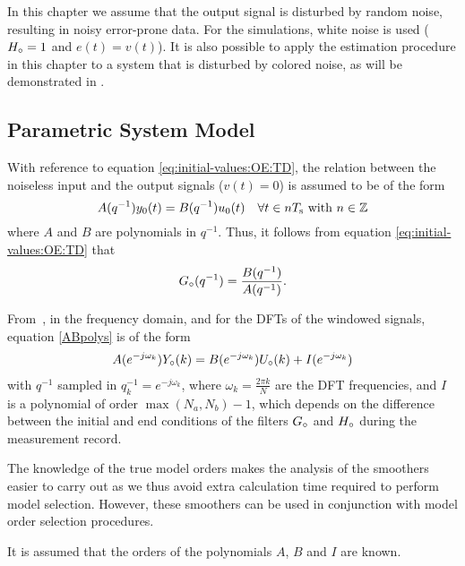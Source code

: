 In this chapter we assume that the output signal is disturbed by random noise, resulting in noisy error-prone data.
For the simulations, white noise is used (${H}_{\circ} = 1$ and $e(t) = v(t)$).
It is also possible to apply the estimation procedure in this chapter to a system that is disturbed by colored noise, as will be demonstrated in . 

\subsection{Parametric System Model}

With reference to equation \eqref{eq:initial-values:OE:TD}, the relation between the noiseless input and the output signals ($v(t)= 0$) is assumed to be of the form
\begin{equation}
    A(q^{-1}) y_0(t) = B(q^{-1}) u_0(t) \quad \forall t \in n T_{\mathrm{s}}{}  \text{ with }  n \in \mathbb{Z}
\label{ABpolys}
\end{equation}
where $A$ and $B$ are polynomials in $q^{-1}$. 
Thus, it follows from equation \eqref{eq:initial-values:OE:TD} that
\begin{equation}
    {G}_{\circ}(q^{-1})= \frac{B(q^{-1})}{A(q^{-1})}
    \text{.}
\end{equation}

From~\citet[Section 6.3.2.]{Pintelon2012}, in the frequency domain, and for the \glspl{DFT} of the windowed signals, equation \eqref{ABpolys} is of the form
\begin{align}
A(e^{-j\omega_k}){Y}_{\circ}(k) = B(e^{-j\omega_k}){U}_{\circ}(k) + I(e^{-j\omega_k})
\label{DFTspectra}
\end{align}
with $q^{-1}$ sampled in  $q_k^{-1} = e^{-j\omega_k}$, where $\omega_k = \frac{2\pi k}{N}$ are the \gls{DFT} frequencies, and $I$ is a polynomial of order $\max(N_a,N_b) - 1$, which depends on the difference between the initial and end conditions of the filters ${G}_{\circ}$ and ${H}_{\circ}$ during the measurement record.

\begin{remark}
The knowledge of the true model orders makes the analysis of the smoothers easier to carry out as we thus avoid extra calculation time required to perform model selection.
However, these smoothers can be used in conjunction with model order selection procedures.
\end{remark}

\begin{assumption}
It is assumed that the orders of the polynomials $A$, $B$ and $I$ are known.
\end{assumption}


